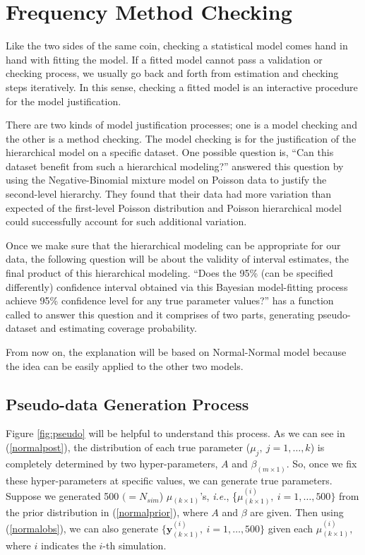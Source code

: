 \documentclass[article]{jss}
\begin{document}
\section[Frequency Method Checking]{Frequency Method Checking}
Like the two sides of the same coin, checking a statistical model comes hand in hand with fitting the model. If a fitted model cannot pass a validation or checking process, we usually go back and forth from estimation and checking steps iteratively. In this sense, checking a fitted model is an interactive procedure for the model justification.


There are two kinds of model justification processes; one is a model checking and the other is a method checking. The model checking is for the justification of the hierarchical model on a specific dataset. One possible question is, ``Can this dataset benefit from such a hierarchical modeling?'' \cite{1997} answered this question by using the Negative-Binomial mixture model on Poisson data to justify the second-level hierarchy. They found that their data had more variation than expected of the first-level Poisson distribution and Poisson hierarchical model could successfully account for such additional variation.


Once we make sure that the hierarchical modeling can be appropriate for our data, the following question will be about the validity of interval estimates, the final product of this hierarchical modeling. ``Does the 95\% (can be specified differently) confidence interval obtained via this Bayesian model-fitting process achieve 95\% confidence level  for any true parameter values?''  has a function called  to answer this question and it comprises of two parts, generating pseudo-dataset and estimating coverage probability.

From now on, the explanation will be based on Normal-Normal model because the idea can be easily applied to the other two models.

\subsection{Pseudo-data Generation Process}
Figure \ref{fig:pseudo} will be helpful to understand this process. As we can see in (\ref{normalpost}), the distribution of each true parameter ($\mu_{j},~j=1,\ldots, k$) is completely determined by two hyper-parameters, $A$ and $\beta_{(m\times1)}$. So, once we fix these hyper-parameters at specific values, we can generate true parameters. Suppose we generated 500 $(=N_{sim}$) {\boldmath $\mu$}$_{(k\times1)}$'s, \emph{i.e.}, \{{\boldmath $\mu$}$^{(i)}_{(k\times1)},~i=1, \ldots, 500\}$ from the prior distribution in (\ref{normalprior}), where $A$ and $\beta$ are given. Then using (\ref{normalobs}), we can also generate $\{\mathbf{y}^{(i)}_{(k\times1)},~i=1, \ldots, 500\}$ given each {\boldmath$\mu$}$^{(i)}_{(k\times1)}, $ where $i$ indicates the $i$-th simulation. 
\end{document}
